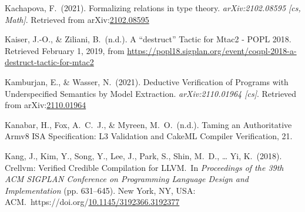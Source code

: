 \documentclass[12pt,twoside]{article}
\begin{document}
{\begin{thebibliography}{1079}
\mdbibitemlabel{}Kachapova, F.~(2021). Formalizing relations in type theory. \emph{arXiv:2102.08595 {}[cs, Math]}. Retrieved from arXiv:\href{http://arxiv.org/abs/2102.08595}{2102.08595}%

\mdbibitemlabel{}Kaiser, J.-O., \& Ziliani, B.~(n.d.). A \textquotedblleft{}destruct\textquotedblright{} Tactic for Mtac2 - POPL 2018. Retrieved February 1, 2019, from \href{https://popl18.sigplan.org/event/coqpl-2018-a-destruct-tactic-for-mtac2}{{\ttfamily https://\hspace{0pt}popl18.\hspace{0pt}sigplan.\hspace{0pt}org/\hspace{0pt}event/\hspace{0pt}coqpl-\hspace{0pt}2018-\hspace{0pt}a-\hspace{0pt}destruct-\hspace{0pt}tactic-\hspace{0pt}for-\hspace{0pt}mtac2}}%

\mdbibitemlabel{}Kamburjan, E., \& Wasser, N.~(2021). Deductive Verification of Programs with Underspecified Semantics by Model Extraction. \emph{arXiv:2110.01964 {}[cs]}. Retrieved from arXiv:\href{http://arxiv.org/abs/2110.01964}{2110.01964}%

\mdbibitemlabel{}Kanabar, H., Fox, A.~C.~J., \& Myreen, M.~O.~(n.d.). Taming an Authoritative Armv8 ISA Specification: L3 Validation and CakeML Compiler Verification, 21.%

\mdbibitemlabel{}Kang, J., Kim, Y., Song, Y., Lee, J., Park, S., Shin, M.~D., … Yi, K.~(2018). Crellvm: Verified Credible Compilation for LLVM.~In \emph{Proceedings of the 39th ACM SIGPLAN Conference on Programming Language Design and Implementation} (pp. 631–645). New York, NY, USA: ACM.~https://doi.org/\href{https://dx.doi.org/10.1145/3192366.3192377}{10.1145/3192366.3192377}%


\end{thebibliography}}
\end{document}
